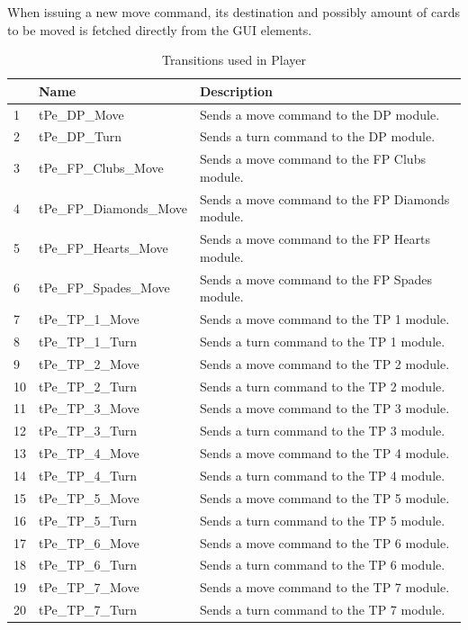 \documentclass[runningheads,a4paper]{llncs}
\begin{document}
When issuing a new move command, its destination and possibly amount of cards to be moved is fetched directly from the GUI elements. 
\begin{table}
	\caption{Transitions used in Player}
	\begin{tabular}{|l|l|l|}
		\hline
		& Name & Description \\
		\hline
		1 & tPe\_DP\_Move            &  Sends a move command to the DP module.  \\ \hline
		2 & tPe\_DP\_Turn            &  Sends a turn command to the DP module.  \\ \hline
		3 & tPe\_FP\_Clubs\_Move     &  Sends a move command to the FP Clubs module.  \\ \hline
		4 & tPe\_FP\_Diamonds\_Move  &  Sends a move command to the FP Diamonds module.  \\ \hline
		5 & tPe\_FP\_Hearts\_Move    &  Sends a move command to the FP Hearts module.  \\ \hline
		6 & tPe\_FP\_Spades\_Move    &  Sends a move command to the FP Spades module.  \\ \hline
		7 & tPe\_TP\_1\_Move         &  Sends a move command to the TP 1 module.  \\ \hline
		8 & tPe\_TP\_1\_Turn         &  Sends a turn command to the TP 1 module.  \\ \hline
		9 & tPe\_TP\_2\_Move         &  Sends a move command to the TP 2 module.  \\ \hline
		10 & tPe\_TP\_2\_Turn        &  Sends a turn command to the TP 2 module.  \\ \hline
		11 & tPe\_TP\_3\_Move        &  Sends a move command to the TP 3 module.  \\ \hline
		12 & tPe\_TP\_3\_Turn        &  Sends a turn command to the TP 3 module.  \\ \hline
		13 & tPe\_TP\_4\_Move        &  Sends a move command to the TP 4 module.  \\ \hline
		14 & tPe\_TP\_4\_Turn        &  Sends a turn command to the TP 4 module.  \\ \hline
		15 & tPe\_TP\_5\_Move        &  Sends a move command to the TP 5 module.  \\ \hline
		16 & tPe\_TP\_5\_Turn        &  Sends a turn command to the TP 5 module.  \\ \hline
		17 & tPe\_TP\_6\_Move        &  Sends a move command to the TP 6 module.  \\ \hline
		18 & tPe\_TP\_6\_Turn        &  Sends a turn command to the TP 6 module.  \\ \hline
		19 & tPe\_TP\_7\_Move        &  Sends a move command to the TP 7 module.  \\ \hline
		20 & tPe\_TP\_7\_Turn        &  Sends a turn command to the TP 7 module.  \\ \hline
	\end{tabular}
\end{table}
\clearpage
\end{document}
